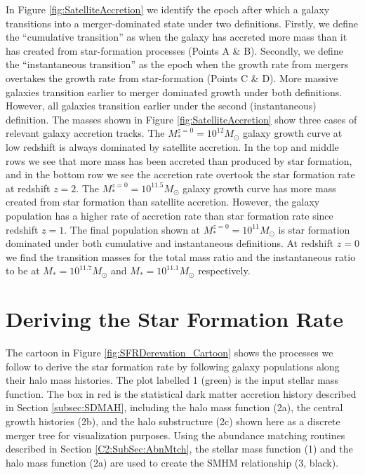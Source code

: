 In Figure \ref{fig:SatelliteAccretion} we identify the epoch after which a galaxy transitions into a merger-dominated state under two definitions. Firstly, we define the ``cumulative transition'' as when the galaxy has accreted more mass than it has created from star-formation processes (Points A \& B). Secondly, we define the ``instantaneous transition'' as  the epoch when the growth rate from mergers overtakes the growth rate from star-formation (Points C \& D). More massive galaxies transition earlier to merger dominated growth under both definitions. However, all galaxies transition earlier under the second (instantaneous) definition. The masses shown in Figure \ref{fig:SatelliteAccretion} show three cases of relevant galaxy accretion tracks. The $M^{z=0}_* = 10^{12} M_{\odot}$ galaxy growth curve at low redshift is always dominated by satellite accretion. In the top and middle rows we see that more mass has been accreted than produced by star formation, and in the bottom row we see the accretion rate overtook the star formation rate at redshift $z=2$. The $M^{z=0}_* = 10^{11.5} M_{\odot}$ galaxy growth curve has more mass created from star formation than satellite accretion. However, the galaxy population has a higher rate of accretion rate than star formation rate since redshift $z = 1$. The final population shown at $M^{z=0}_* = 10^{11} M_{\odot}$ is star formation dominated under both cumulative and instantaneous definitions. At redshift $z = 0$ we find the transition masses for the total mass ratio and the instantaneous ratio to be at $M_* = 10^{11.7} M_{\odot}$ and $M_* = 10^{11.1} M_{\odot}$ respectively.

\section{Deriving the Star Formation Rate}
\label{sec:SFR_Dev}

The cartoon in Figure \ref{fig:SFRDerevation_Cartoon} shows the processes we follow to derive the star formation rate by following galaxy populations along their halo mass histories. \textcolor{MPLgreen}{The plot labelled 1 (green) is the input stellar mass function.} \textcolor{MPLred}{The box in red is the statistical dark matter accretion history described in Section \ref{subsec:SDMAH}, including the halo mass function (2a), the central growth histories (2b), and the halo substructure (2c) shown here as a discrete merger tree for visualization purposes.} Using the abundance matching routines described in Section \ref{C2:SubSec:AbnMtch}, the \textcolor{MPLgreen}{stellar mass function (1)} and the \textcolor{MPLred}{halo mass function (2a)} are used to create the SMHM relationship (3, black).



